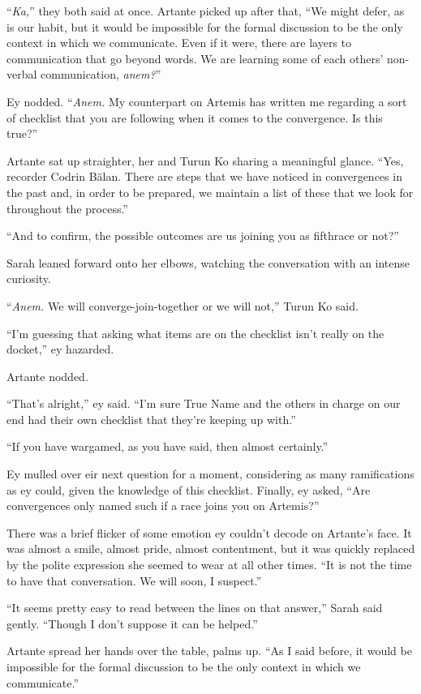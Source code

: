 ``\emph{Ka,}'' they both said at once. Artante picked up after that, ``We might defer, as is our habit, but it would be impossible for the formal discussion to be the only context in which we communicate. Even if it were, there are layers to communication that go beyond words. We are learning some of each others' non-verbal communication, \emph{anem?}''

Ey nodded. ``\emph{Anem.} My counterpart on Artemis has written me regarding a sort of checklist that you are following when it comes to the convergence. Is this true?''

Artante sat up straighter, her and Turun Ko sharing a meaningful glance. ``Yes, recorder Codrin Bălan. There are steps that we have noticed in convergences in the past and, in order to be prepared, we maintain a list of these that we look for throughout the process.''

``And to confirm, the possible outcomes are us joining you as fifthrace or not?''

Sarah leaned forward onto her elbows, watching the conversation with an intense curiosity.

``\emph{Anem.} We will converge-join-together or we will not,'' Turun Ko said.

``I'm guessing that asking what items are on the checklist isn't really on the docket,'' ey hazarded.

Artante nodded.

``That's alright,'' ey said. ``I'm sure True Name and the others in charge on our end had their own checklist that they're keeping up with.''

``If you have wargamed, as you have said, then almost certainly.''

Ey mulled over eir next question for a moment, considering as many ramifications as ey could, given the knowledge of this checklist. Finally, ey asked, ``Are convergences only named such if a race joins you on Artemis?''

There was a brief flicker of some emotion ey couldn't decode on Artante's face. It was almost a smile, almost pride, almost contentment, but it was quickly replaced by the polite expression she seemed to wear at all other times. ``It is not the time to have that conversation. We will soon, I suspect.''

``It seems pretty easy to read between the lines on that answer,'' Sarah said gently. ``Though I don't suppose it can be helped.''

Artante spread her hands over the table, palms up. ``As I said before, it would be impossible for the formal discussion to be the only context in which we communicate.''

